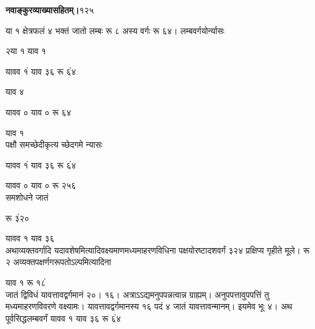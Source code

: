 \documentclass[11pt, openany]{book}
\begin{document}
\onehalfspacing
\hspace{2in}\textbf{नवाङ्कुरव्याख्यासहितम्।}\hspace{2in}१२५

\vspace{5mm}

\begin{sloppypar}
\hangindent=0.2in या १ क्षेत्रफलं ४ भक्तं जातो लम्बः रू ८ अस्य वर्गः रू ६४। लम्बवर्गयोर्न्यासः

\hspace{0.25in}२\hspace{1.85in}या १\hspace{0.75in} याव १

\hspace{1.5in}यावव १ं याव ३६ रू ६ं४

\hspace{1.5in}याव ४

\hspace{1.5in}यावव ० याव ० रू ६४

\hspace{1.5in}याव १\\

\hangindent=0.2in \hspace{0.2in}पक्षौ समच्छेदीकृत्य च्छेदगमे न्यासः

\hspace{1.5in}यावव १ं याव ३६ रू ६ं४

\hspace{1.5in}यावव ० याव ० रू २५६\\

\hangindent=0.2in \hspace{0.2in}समशोधने जातं

\hspace{1.5in}रू ३ं२०

\hspace{1.5in}यावव १ याव ३६\\

\hangindent=0.2in \hspace{0.2in}अथाव्यक्तवर्गादि यदावशेषमित्यादिवक्ष्यमाणमध्यमाहरणविधिना पक्षयोरष्टादशवर्गं ३२४ प्रक्षिप्य गृहीते मूले। रू २ अव्यक्तपक्षर्णगरूपतोऽल्पमित्यादिना

\hspace{0.4in}याव १ रू १८ं\\

\hangindent=0.2in जातं द्विविधं यावत्तावद्वर्गमानं २०। १६। अत्राऽऽद्यमनुपपन्नत्वान्न ग्राह्यम्। अनुपपत्तावुपपत्तिं तु मध्यमाहरणविवरणे वक्ष्यामः। यावत्तावद्वर्गमानस्य १६ पदं ४ जातं यावत्तावन्मानम्। इयमेव भूः ४। अथ पूर्वसिद्धलम्बवर्गं यावव १ याव ३६ रू ६ं४


\end{sloppypar}
\end{document}
